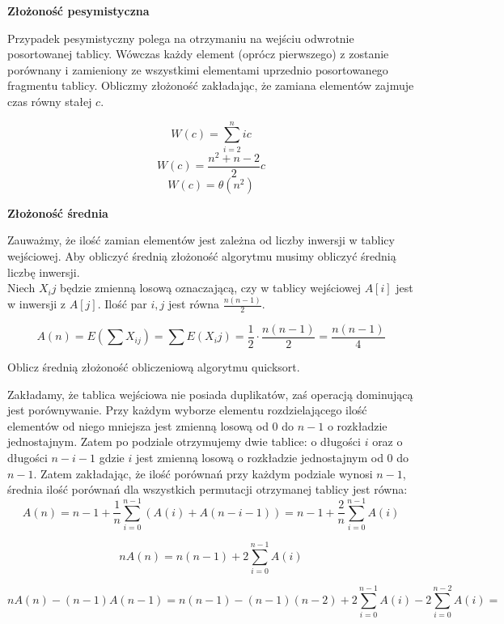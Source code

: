 \documentclass[12pt]{article}
\begin{document}
        \textbf{Złożoność pesymistyczna}
        
        Przypadek pesymistyczny polega na otrzymaniu na wejściu odwrotnie posortowanej tablicy. 
        Wówczas każdy element (oprócz pierwszego) z zostanie porównany 
        i zamieniony ze wszystkimi elementami uprzednio posortowanego fragmentu tablicy. 
        Obliczmy złożoność zakładając, że zamiana elementów zajmuje czas równy stałej $c$.
        
        $$W(c) = \sum_{i = 2}^nic$$
        $$W(c) = \frac{n^2 + n - 2}{2}c$$
        $$W(c) = \theta(n^2)$$
        
        \textbf{Złożoność średnia}
        
        Zauważmy, że ilość zamian elementów jest zależna od liczby inwersji w tablicy wejściowej. Aby obliczyć średnią złożoność algorytmu musimy obliczyć średnią liczbę inwersji.\\
        
        Niech $X_ij$ będzie zmienną losową oznaczającą, czy w tablicy wejściowej $A[i]$ jest w inwersji z $A[j]$.
	Ilość par $i,j$ jest równa $\frac{n(n-1)}{2}.$
        
        $$A(n) = E(\sum X_{ij}) = \sum E(X_ij) = \frac{1}{2} \cdot \frac{n(n - 1)}{2} = \frac{n(n - 1)}{4}$$
        
        \begin{exercise}
        Oblicz średnią złożoność obliczeniową algorytmu quicksort.
        \end{exercise}
        
        Zakładamy, że tablica wejściowa nie posiada duplikatów, zaś operacją dominującą jest porównywanie.
	Przy każdym wyborze elementu rozdzielającego ilość elementów od niego mniejsza jest zmienną losową od 0 do $n - 1$ o rozkładzie jednostajnym. 
        Zatem po podziale otrzymujemy dwie tablice: o długości $i$ oraz o długości $n - i - 1$ gdzie $i$ jest zmienną losową o rozkładzie jednostajnym od 0 do $n - 1$. 
        Zatem zakładając, że ilość porównań przy każdym podziale wynosi $n - 1$, średnia ilość porównań dla wszystkich permutacji otrzymanej tablicy jest równa:
        $$A(n) = n - 1 + \frac{1}{n}\sum_{i = 0}^{n - 1}(A(i) + A(n - i - 1)) = 
        n - 1 + \frac{2}{n}\sum_{i = 0}^{n - 1}A(i)$$
        
        $$nA(n) = n(n - 1) + 2 \sum_{i = 0}^{n - 1}A(i)$$
        
        $$nA(n) - (n - 1)A(n-1) = n(n - 1) - (n - 1)(n - 2) + 2\sum_{i = 0}^{n - 1}A(i) - 2\sum_{i = 0}^{n - 2}A(i) = $$
        
\end{document}
